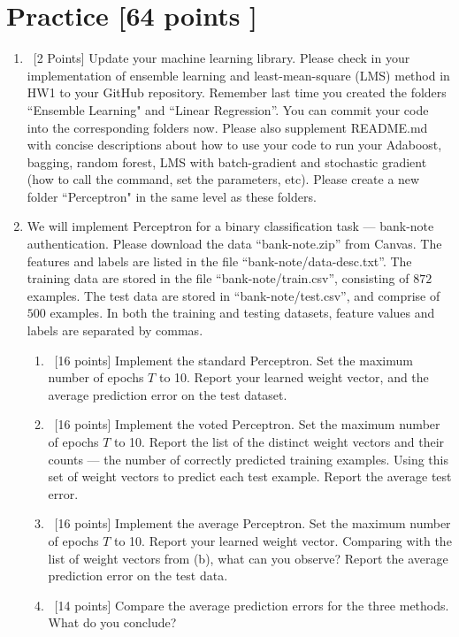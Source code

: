 \documentclass[12pt, fullpage,letterpaper]{article}
\begin{document}
\section{Practice [64 points ]}
\begin{enumerate}
	\item~[2 Points] Update your machine learning library. Please check in your implementation of ensemble learning and least-mean-square (LMS) method in HW1 to your GitHub repository. Remember last time you created the folders ``Ensemble Learning" and ``Linear Regression''. You can commit your code into the corresponding folders now. Please also supplement README.md with concise descriptions about how to use your code to run your Adaboost, bagging, random forest, LMS with batch-gradient and stochastic gradient (how to call the command, set the parameters, etc). Please create a new folder ``Perceptron" in the same level as these folders.  

\item We will implement  Perceptron for a binary classification task --- bank-note authentication. Please download the data ``bank-note.zip'' from Canvas. The features and labels are listed in the file ``bank-note/data-desc.txt''. The training data are stored in the file ``bank-note/train.csv'', consisting of $872$ examples. The test data are stored in ``bank-note/test.csv'', and comprise of $500$ examples. In both the training and testing datasets, feature values and labels are separated by commas. 
\begin{enumerate}
	\item~[16 points] Implement the standard Perceptron. Set the maximum number of epochs $T$ to 10. Report your learned weight vector, and the average prediction error on the test dataset. 
	\item~[16 points] Implement the voted Perceptron. Set the maximum number of epochs $T$ to 10. Report the list of the distinct weight vectors and their counts --- the number of correctly predicted training examples. Using this set of weight vectors to predict each test example. Report the average test error. 
	\item~[16 points] Implement the average Perceptron. Set the maximum number of epochs $T$ to 10. Report your learned weight vector. Comparing with the list of weight vectors from (b), what can you observe? Report the average prediction error on the test data. 
	\item~[14 points] Compare the average prediction errors for the three methods. What do you conclude? 
\end{enumerate}


\end{enumerate}
\end{document}
